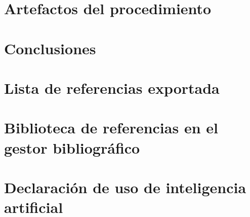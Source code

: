 \documentclass[conference,onecolumn]{IEEEtran}
\begin{document}
\section{Artefactos del procedimiento}







\section{Conclusiones}


\printbibliography[title={Referencias}]

\appendices
\section{Lista de referencias exportada}


\section{Biblioteca de referencias en el gestor bibliográfico}


\section*{Declaración de uso de inteligencia artificial}

\end{document}
